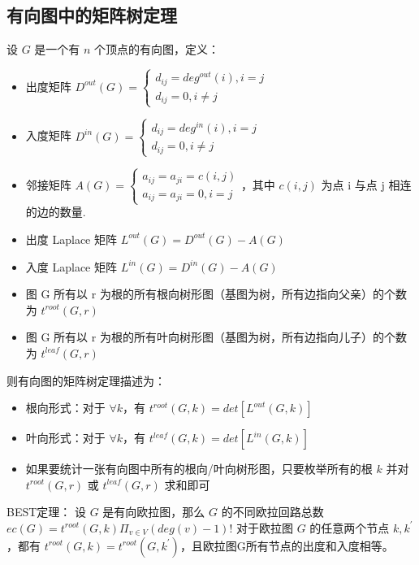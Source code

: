 \subsection{有向图中的矩阵树定理}
\par 设 $G$ 是一个有 $n$ 个顶点的有向图，定义：
\begin{itemize}
\item 出度矩阵 $D^{out}\left(G\right)=\begin{cases}d_{ij}=deg^{out}(i), i=j \\ d_{ij} = 0, i \neq j\end{cases}$ 
\item 入度矩阵 $D^{in}(G) = \begin{cases}d_{ij}=deg^{in}(i), i=j \\ d_{ij} = 0, i \neq j\end{cases}$
\item 邻接矩阵 $A(G) = \begin{cases}a_{ij}=a_{ji}=c(i,j) \\ a_{ij}=a_{ji}=0, i = j \end{cases}$，其中 $c(i, j)$ 为点 i 与点 j 相连的边的数量.
\item 出度 Laplace 矩阵 $L^{out}(G)=D^{out}(G)-A(G)$
\item 入度 Laplace 矩阵 $L^{in}(G)=D^{in}(G)-A(G)$
\item 图 G 所有以 r 为根的所有根向树形图（基图为树，所有边指向父亲）的个数为 $t^{root}\left(G,r\right)$
\item 图 G 所有以 r 为根的所有叶向树形图（基图为树，所有边指向儿子）的个数为 $t^{leaf}\left(G,r\right)$
\end{itemize}
\par 则有向图的矩阵树定理描述为：
\begin{itemize}
\item 根向形式：对于 $\forall k$，有 $t^{root}\left(G,k\right)=det\left[L^{out}\left(G,k\right)\right]$
\item 叶向形式：对于 $\forall k$，有 $t^{leaf}\left(G,k\right)=det\left[L^{in}\left(G,k\right)\right]$
\item 如果要统计一张有向图中所有的根向/叶向树形图，只要枚举所有的根 $k$ 并对$t^{root}\left(G,r\right)$ 或 $t^{leaf}(G,r)$ 求和即可
\end{itemize}
\par BEST定理：	设 $G$ 是有向欧拉图，那么 $G$ 的不同欧拉回路总数 $ec\left(G\right)=t^{root}\left(G,k\right)\Pi_{v\in V}\left(deg\left(v\right)-1\right)!$
对于欧拉图 $G$ 的任意两个节点 $k,k^\prime$，都有 $t^{root}\left(G,k\right)=t^{root}\left(G,k^\prime\right)$，且欧拉图G所有节点的出度和入度相等。

